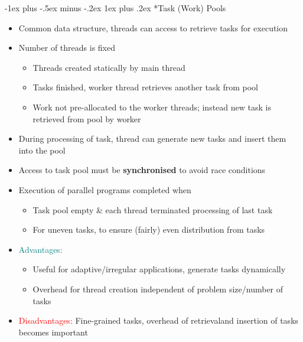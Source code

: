\documentclass[10pt,landscape]{article}
\makeatletter
\renewcommand{\subsubsection}{\@startsection{subsubsection}{3}{0mm}%
                                {-1ex plus -.5ex minus -.2ex}%
                                {1ex plus .2ex}%
                                {\normalfont\small\bfseries}}
\makeatother
\begin{document}
\begin{multicols*}{3}
\subsubsection*{Task (Work) Pools}
\begin{itemize}[topsep=0pt,noitemsep,wide=0pt, leftmargin=\dimexpr{} + 2\relax]
    \item Common data structure, threads can access to retrieve tasks for execution
    \item Number of threads is fixed
    \begin{itemize}[topsep=0pt,noitemsep,wide=0pt, leftmargin=\dimexpr{} + 2\relax]
        \item Threads created statically by main thread
        \item Tasks finished, worker thread retrieves another task from pool
        \item Work not pre-allocated to the worker threads; instead new task is retrieved from pool by worker
    \end{itemize}
    \item During processing of task, thread can generate new tasks and insert them into the pool
    \item Access to task pool must be \textbf{synchronised} to avoid race conditions
    \item Execution of parallel programs completed when
    \begin{itemize}[topsep=0pt,noitemsep,wide=0pt, leftmargin=\dimexpr{} + 2\relax]
        \item Task pool empty \& each thread terminated processing of last task
        \item For uneven tasks, to ensure (fairly) even distribution from tasks
    \end{itemize}
    \item \textcolor{teal}{Advantages:} 
    \begin{itemize}[topsep=0pt,noitemsep,wide=0pt, leftmargin=\dimexpr{} + 2\relax]
        \item Useful for adaptive/irregular applications, generate tasks dynamically
        \item Overhead for thread creation independent of problem size/number of tasks
    \end{itemize}
    \item \textcolor{red}{Disadvantages:} Fine-grained tasks, overhead of retrievaland insertion of tasks becomes important
\end{itemize}


\end{multicols*}
\end{document}
